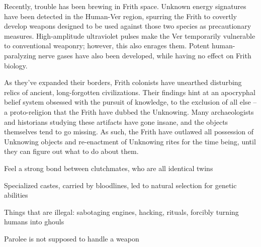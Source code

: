\documentclass[blue]{guildcamp4}
\begin{document}
Recently, trouble has been brewing in Frith space. Unknown energy signatures have been detected in the Human-Ver region, spurring the Frith to covertly develop weapons designed to be used against those two species as precautionary measures. High-amplitude ultraviolet pulses make the Ver temporarily vulnerable to conventional weaponry; however, this also enrages them. Potent human-paralyzing nerve gases have also been developed, while having no effect on Frith biology.

As they've expanded their borders, Frith colonists have unearthed disturbing relics of ancient, long-forgotten civilizations. Their findings hint at an apocryphal belief system obsessed with the pursuit of knowledge, to the exclusion of all else -- a proto-religion that the Frith have dubbed the Unknowing. Many archaeologists and historians studying these artifacts have gone insane, and the objects themselves tend to go missing. As such, the Frith have outlawed all possession of Unknowing objects and re-enactment of Unknowing rites for the time being, until they can figure out what to do about them.
	
\begin{itemz}[To add]
\item Feel a strong bond between clutchmates, who are all identical twins
\item Specialized castes, carried by bloodlines, led to natural selection for genetic abilities 
\item Things that are illegal: sabotaging engines, hacking, rituals, forcibly turning humans into ghouls
\item Parolee is not supposed to handle a weapon

\end{itemz}
	
\end{document}
